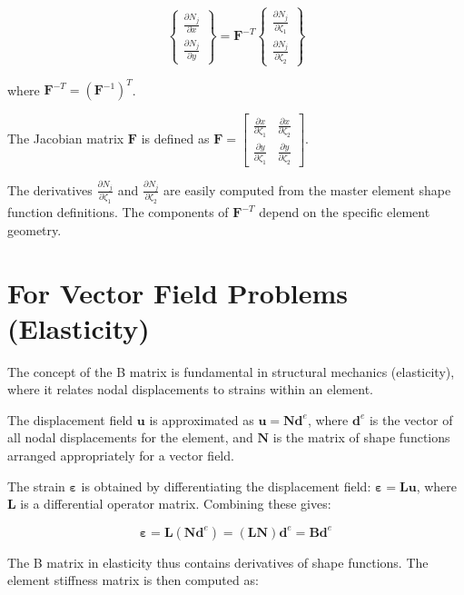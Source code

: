 \documentclass[
  11pt,
  a4paper,
]{scrbook}
\begin{document}
\[\begin{Bmatrix} \frac{\partial N_j}{\partial x} \\ \frac{\partial N_j}{\partial y} \end{Bmatrix} = \mathbf{F}^{-T} \begin{Bmatrix} \frac{\partial N_j}{\partial \zeta_1} \\ \frac{\partial N_j}{\partial \zeta_2} \end{Bmatrix}\]

where \(\mathbf{F}^{-T} = (\mathbf{F}^{-1})^T\).

The Jacobian matrix \(\mathbf{F}\) is defined as
\(\mathbf{F} = \begin{bmatrix} \frac{\partial x}{\partial \zeta_1} & \frac{\partial x}{\partial \zeta_2} \\ \frac{\partial y}{\partial \zeta_1} & \frac{\partial y}{\partial \zeta_2} \end{bmatrix}\).

The derivatives \(\frac{\partial N_j}{\partial \zeta_1}\) and
\(\frac{\partial N_j}{\partial \zeta_2}\) are easily computed from the
master element shape function definitions. The components of
\(\mathbf{F}^{-T}\) depend on the specific element geometry.

\section{For Vector Field Problems
(Elasticity)}\label{for-vector-field-problems-elasticity}

The concept of the B matrix is fundamental in structural mechanics
(elasticity), where it relates nodal displacements to strains within an
element.

The displacement field \(\mathbf{u}\) is approximated as
\(\mathbf{u} = \mathbf{N} \mathbf{d}^e\), where \(\mathbf{d}^e\) is the
vector of all nodal displacements for the element, and \(\mathbf{N}\) is
the matrix of shape functions arranged appropriately for a vector field.

The strain \(\boldsymbol{\varepsilon}\) is obtained by differentiating
the displacement field:
\(\boldsymbol{\varepsilon} = \mathbf{L} \mathbf{u}\), where
\(\mathbf{L}\) is a differential operator matrix. Combining these gives:

\[\boldsymbol{\varepsilon} = \mathbf{L}(\mathbf{N} \mathbf{d}^e) = (\mathbf{L} \mathbf{N}) \mathbf{d}^e = \mathbf{B} \mathbf{d}^e\]

The B matrix in elasticity thus contains derivatives of shape functions.
The element stiffness matrix is then computed as:
\end{document}
